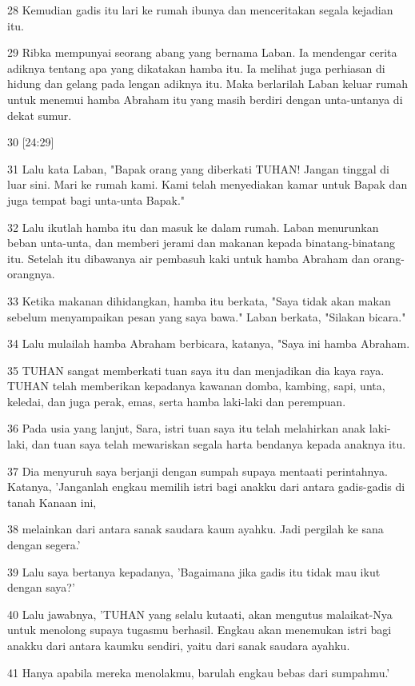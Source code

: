 \par 28 Kemudian gadis itu lari ke rumah ibunya dan menceritakan segala kejadian itu.
\par 29 Ribka mempunyai seorang abang yang bernama Laban. Ia mendengar cerita adiknya tentang apa yang dikatakan hamba itu. Ia melihat juga perhiasan di hidung dan gelang pada lengan adiknya itu. Maka berlarilah Laban keluar rumah untuk menemui hamba Abraham itu yang masih berdiri dengan unta-untanya di dekat sumur.
\par 30 [24:29]
\par 31 Lalu kata Laban, "Bapak orang yang diberkati TUHAN! Jangan tinggal di luar sini. Mari ke rumah kami. Kami telah menyediakan kamar untuk Bapak dan juga tempat bagi unta-unta Bapak."
\par 32 Lalu ikutlah hamba itu dan masuk ke dalam rumah. Laban menurunkan beban unta-unta, dan memberi jerami dan makanan kepada binatang-binatang itu. Setelah itu dibawanya air pembasuh kaki untuk hamba Abraham dan orang-orangnya.
\par 33 Ketika makanan dihidangkan, hamba itu berkata, "Saya tidak akan makan sebelum menyampaikan pesan yang saya bawa." Laban berkata, "Silakan bicara."
\par 34 Lalu mulailah hamba Abraham berbicara, katanya, "Saya ini hamba Abraham.
\par 35 TUHAN sangat memberkati tuan saya itu dan menjadikan dia kaya raya. TUHAN telah memberikan kepadanya kawanan domba, kambing, sapi, unta, keledai, dan juga perak, emas, serta hamba laki-laki dan perempuan.
\par 36 Pada usia yang lanjut, Sara, istri tuan saya itu telah melahirkan anak laki-laki, dan tuan saya telah mewariskan segala harta bendanya kepada anaknya itu.
\par 37 Dia menyuruh saya berjanji dengan sumpah supaya mentaati perintahnya. Katanya, 'Janganlah engkau memilih istri bagi anakku dari antara gadis-gadis di tanah Kanaan ini,
\par 38 melainkan dari antara sanak saudara kaum ayahku. Jadi pergilah ke sana dengan segera.'
\par 39 Lalu saya bertanya kepadanya, 'Bagaimana jika gadis itu tidak mau ikut dengan saya?'
\par 40 Lalu jawabnya, 'TUHAN yang selalu kutaati, akan mengutus malaikat-Nya untuk menolong supaya tugasmu berhasil. Engkau akan menemukan istri bagi anakku dari antara kaumku sendiri, yaitu dari sanak saudara ayahku.
\par 41 Hanya apabila mereka menolakmu, barulah engkau bebas dari sumpahmu.'
